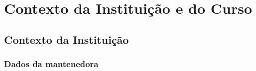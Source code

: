 \newpage
\section{Contexto da Institui\c{c}\~ao e do Curso}

\subsection{Contexto da Institui\c{c}\~ao}

\subsubsection{Dados da mantenedora}

